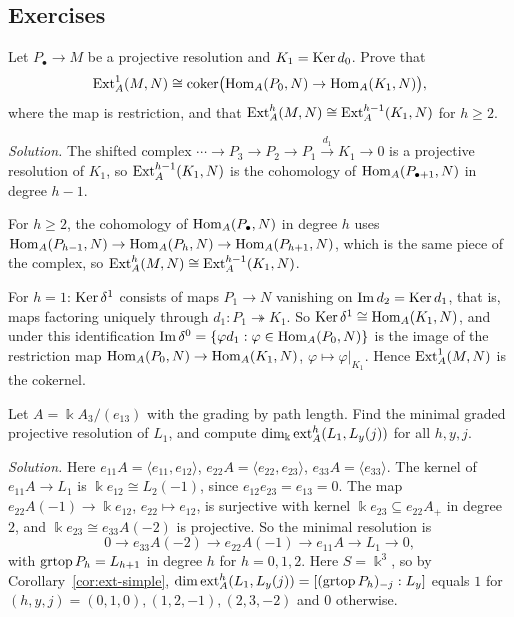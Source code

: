\subsection{Exercises}

\begin{exercise}
Let $P_\bullet\to M$ be a projective resolution and $K_1=\operatorname{Ker}\nolimits d_0$.
Prove that
\[
\operatorname{Ext}\nolimits_A^1(M,N)\cong\operatorname{coker}\bigl(\operatorname{Hom}\nolimits_A(P_0,N)\to\operatorname{Hom}\nolimits_A(K_1,N)\bigr),
\]
where the map is restriction, and that $\operatorname{Ext}\nolimits_A^h(M,N)\cong\operatorname{Ext}\nolimits_A^{h-1}(K_1,N)$ for $h\geq2$.
\end{exercise}

\begin{hidden}
\emph{Solution.}
The shifted complex $\cdots\to P_3\to P_2\to P_1\xrightarrow{d_1}K_1\to0$ is a projective resolution of $K_1$, so $\operatorname{Ext}\nolimits_A^{h-1}(K_1,N)$ is the cohomology of $\operatorname{Hom}\nolimits_A(P_{\bullet+1},N)$ in degree $h-1$.

For $h\geq2$, the cohomology of $\operatorname{Hom}\nolimits_A(P_\bullet,N)$ in degree $h$ uses $\operatorname{Hom}\nolimits_A(P_{h-1},N)\to\operatorname{Hom}\nolimits_A(P_h,N)\to\operatorname{Hom}\nolimits_A(P_{h+1},N)$, which is the same piece of the complex, so $\operatorname{Ext}\nolimits_A^h(M,N)\cong\operatorname{Ext}\nolimits_A^{h-1}(K_1,N)$.

For $h=1$: $\operatorname{Ker}\nolimits\delta^1$ consists of maps $P_1\to N$ vanishing on $\operatorname{Im}\nolimits d_2=\operatorname{Ker}\nolimits d_1$, that is, maps factoring uniquely through $d_1:P_1\twoheadrightarrow K_1$.
So $\operatorname{Ker}\nolimits\delta^1\cong\operatorname{Hom}\nolimits_A(K_1,N)$, and under this identification $\operatorname{Im}\nolimits\delta^0=\{\varphi d_1:\varphi\in\operatorname{Hom}\nolimits_A(P_0,N)\}$ is the image of the restriction map $\operatorname{Hom}\nolimits_A(P_0,N)\to\operatorname{Hom}\nolimits_A(K_1,N)$, $\varphi\mapsto\varphi|_{K_1}$.
Hence $\operatorname{Ext}\nolimits_A^1(M,N)$ is the cokernel.
\end{hidden}


\begin{exercise}
Let $A=\Bbbk A_3/(e_{13})$ with the grading by path length.
Find the minimal graded projective resolution of $L_1$, and compute $\dim_\Bbbk\operatorname{ext}\nolimits_A^h(L_1,L_y(j))$ for all $h,y,j$.
\end{exercise}

\begin{hidden}
\emph{Solution.}
Here $e_{11}A=\langle e_{11},e_{12}\rangle$, $e_{22}A=\langle e_{22},e_{23}\rangle$, $e_{33}A=\langle e_{33}\rangle$.
The kernel of $e_{11}A\to L_1$ is $\Bbbk e_{12}\cong L_2(-1)$, since $e_{12}e_{23}=e_{13}=0$.
The map $e_{22}A(-1)\to\Bbbk e_{12}$, $e_{22}\mapsto e_{12}$, is surjective with kernel $\Bbbk e_{23}\subseteq e_{22}A_+$ in degree $2$, and $\Bbbk e_{23}\cong e_{33}A(-2)$ is projective.
So the minimal resolution is
\[
0\to e_{33}A(-2)\to e_{22}A(-1)\to e_{11}A\to L_1\to0,
\]
with $\operatorname{grtop}\nolimits P_h=L_{h+1}$ in degree $h$ for $h=0,1,2$.
Here $S=\Bbbk^3$, so by Corollary~\ref{cor:ext-simple}, $\dim\operatorname{ext}\nolimits_A^h(L_1,L_y(j))=[(\operatorname{grtop}\nolimits P_h)_{-j}:L_y]$ equals $1$ for $(h,y,j)=(0,1,0),(1,2,-1),(2,3,-2)$ and $0$ otherwise.
\end{hidden}


